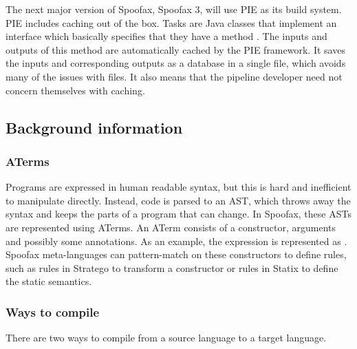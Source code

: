 The next major version of Spoofax, Spoofax 3, will use PIE as its build system.
\Ac{PIE} includes caching out of the box.
Tasks are Java classes that implement an interface which basically specifies that they have a method .
The inputs and outputs of this method are automatically cached by the \ac{PIE} framework.
It saves the inputs and corresponding outputs as a database in a single file, which avoids many of the issues with files.
It also means that the pipeline developer need not concern themselves with caching.

\subsection{Background information}
\label{subsec:problem_analysis__background}

\subsubsection{ATerms}
\label{subsubsec:problem_analysis__background__aterms}

Programs are expressed in human readable syntax, but this is hard and inefficient to manipulate directly.
Instead, code is parsed to an \ac{AST}, which throws away the syntax and keeps the parts of a program that can change.
In Spoofax, these \acp{AST} are represented using ATerms.
An ATerm consists of a constructor, arguments and possibly some annotations.
As an example, the expression  is represented as .
Spoofax meta-languages can pattern-match on these constructors to define rules, such as rules in Stratego to transform a constructor or rules in Statix to define the static semantics.

\subsubsection{Ways to compile}
\label{subsubsec:problem_analysis__background__ways_to_compile}

There are two ways to compile from a source language to a target language.


